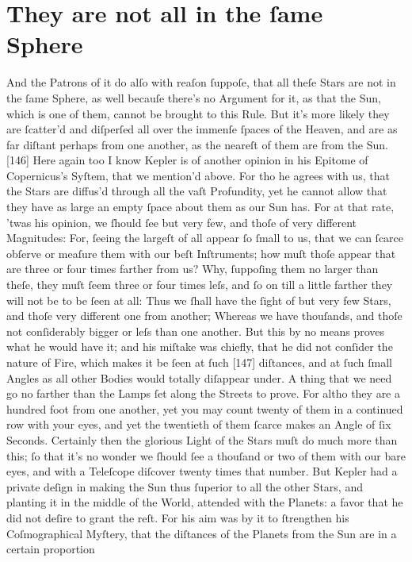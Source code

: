 \documentclass[letterpaper]{book}
\begin{document}
\section{They are not all in the ſame Sphere}

And the Patrons of it do alſo with reaſon ſuppoſe, that all theſe Stars are
not in the ſame Sphere, as well becauſe there's no Argument for it, as that
the Sun, which is one of them, cannot be brought to this Rule. But it's
more likely they are ſcatter'd and diſperſed all over the immenſe ſpaces of
the Heaven, and are as far diſtant perhaps from one another, as the neareſt
of them are from the Sun.
[146] Here again too I know Kepler is of another opinion in his Epitome
of Copernicus's Syſtem, that we mention'd above. For tho he agrees with
us, that the Stars are diffus'd through all the vaſt Profundity, yet he cannot
allow that they have as large an empty ſpace about them as our Sun has.
For at that rate, 'twas his opinion, we ſhould ſee but very few, and thoſe of
very different Magnitudes: For, ſeeing the largeſt of all appear ſo ſmall to
us, that we can ſcarce obſerve or meaſure them with our beſt Inſtruments;
how muſt thoſe appear that are three or four times farther from us? Why,
ſuppoſing them no larger than theſe, they muſt ſeem three or four times
leſs, and ſo on till a little farther they will not be to be ſeen at all: Thus we
ſhall have the ſight of but very few Stars, and thoſe very different one from
another; Whereas we have thouſands, and thoſe not conſiderably bigger or
leſs than one another. But this by no means proves what he would have
it; and his miſtake was chiefly, that he did not conſider the nature of Fire,
which makes it be ſeen at ſuch [147] diſtances, and at ſuch ſmall Angles as
all other Bodies would totally diſappear under. A thing that we need go no
farther than the Lamps ſet along the Streets to prove. For altho they are
a hundred foot from one another, yet you may count twenty of them in a
continued row with your eyes, and yet the twentieth of them ſcarce makes
an Angle of ſix Seconds. Certainly then the glorious Light of the Stars muſt
do much more than this; ſo that it's no wonder we ſhould ſee a thouſand
or two of them with our bare eyes, and with a Teleſcope diſcover twenty
times that number. But Kepler had a private deſign in making the Sun
thus ſuperior to all the other Stars, and planting it in the middle of the
World, attended with the Planets: a favor that he did not deſire to grant
the reſt. For his aim was by it to ſtrengthen his Coſmographical Myſtery,
that the diſtances of the Planets from the Sun are in a certain proportion
\end{document}
